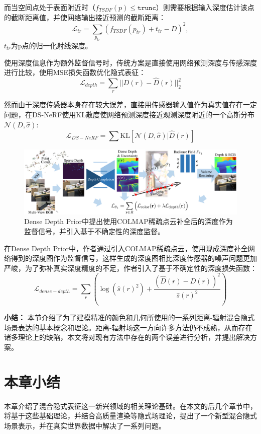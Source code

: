 而当空间点处于表面附近时（$f_{TSDF}(p) \leq \mathtt{trunc}$）则需要根据输入深度估计该点的截断距离值，并使网络输出接近预测的截断距离：
\begin{equation}
    \mathcal{L}_{tr} = \sum_{p_{tr}}(f_{TSDF}(p_{tr})+t_{tr}-D)^2,
\end{equation}
$t_{tr}$为p点的归一化射线深度。

使用深度信息作为额外监督信号时，传统方案是直接使用网络预测深度与传感深度进行比较，使用MSE损失函数优化隐式表征：
\begin{equation}
    \mathcal{L}_{depth}=\sum_r||D(r)-\hat{D}(r)||_2^2
\end{equation}

然而由于深度传感器本身存在较大误差，直接用传感器输入值作为真实值存在一定问题，在DS-NeRF\cite{deng_depth-supervised_2022}使用KL散度使网络预测深度接近观测深度附近的一个高斯分布$\mathcal{N}(D, \hat{\sigma})$:
\begin{equation}
    \mathcal{L}_{DS-NeRF} = \sum\text{KL}[\mathcal{N}(D,\hat{\sigma}) | \hat{D}(r)]
\end{equation}

\begin{figure}[ht]
    \centering
    \includegraphics[width=\textwidth]{undergraduate-thesis/images/dense-depth prior.png}
    \caption{Dense Depth Prior\cite{roessle_dense_2022}中提出使用COLMAP\cite{schonberger_structure--motion_2016}稀疏点云补全后的深度作为监督信号，并引入基于不确定性的深度监督。}
    \label{fig:related-work dense depth prior}
\end{figure}

在Dense Depth Prior\cite{roessle_dense_2022}中，作者通过引入COLMAP\cite{schonberger_structure--motion_2016}稀疏点云，使用现成深度补全网络得到的深度图作为监督信号，这样生成的深度图相比深度传感器的噪声问题更加严峻，为了弥补真实深度精度的不足，作者引入了基于不确定性的深度损失函数：
\begin{equation}
    \mathcal{L}_{dense-depth}=\sum_r\left(\log(\hat{s}(r)^2)+\frac{(\hat{D}(r)-D(r))^2}{\hat{s}(r)^2}\right)
\end{equation}

\noindent\textbf{小结：} 本节介绍了为了建模精准的颜色和几何所使用的一系列距离-辐射混合隐式场景表达的基本概念和理论。距离-辐射场这一方向许多方法仍不成熟，从而存在诸多理论上的缺陷，本文将对现有方法中存在的两个误差进行分析，并提出解决方案。

\section{本章小结}
本章介绍了混合隐式表征这一新兴领域的相关理论基础。在本文的后几个章节中，将基于这些基础理论，并结合高质量渲染等隐式场理论，提出了一个新型混合隐式场景表示，并在真实世界数据中解决了一系列问题。